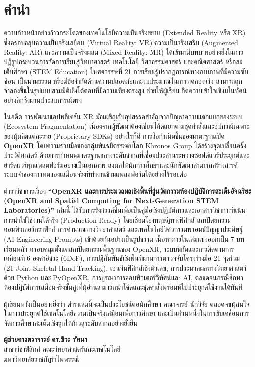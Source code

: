 \chapter*{คำนำ}

ความก้าวหน้าอย่างก้าวกระโดดของเทคโนโลยีความเป็นจริงขยาย (Extended Reality หรือ XR) ซึ่งครอบคลุมความเป็นจริงเสมือน (Virtual Reality: VR) ความเป็นจริงเสริม (Augmented Reality: AR) และความเป็นจริงผสม (Mixed Reality: MR) ได้เข้ามามีบทบาทอย่างยิ่งในการปฏิรูปกระบวนการจัดการเรียนรู้วิทยาศาสตร์ เทคโนโลยี วิศวกรรมศาสตร์ และคณิตศาสตร์ หรือสะเต็มศึกษา (STEM Education) ในศตวรรษที่ 21 การเรียนรู้ปรากฏการณ์ทางกายภาพที่มีความซับซ้อน เป็นนามธรรม หรือมีข้อจำกัดด้านความปลอดภัยและงบประมาณในการทดลองจริง สามารถถูกจำลองขึ้นในรูปแบบสามมิติเชิงโต้ตอบที่มีความเที่ยงตรงสูง ช่วยให้ผู้เรียนเกิดความเข้าใจเชิงมโนทัศน์อย่างลึกซึ้งผ่านประสบการณ์ตรง

ในอดีต การพัฒนาแอปพลิเคชัน XR มักเผชิญกับอุปสรรคสำคัญจากปัญหาความแตกแยกของระบบ (Ecosystem Fragmentation) เนื่องจากผู้พัฒนาต้องเขียนโค้ดแยกตามชุดคำสั่งและอุปกรณ์เฉพาะของผู้ผลิตแต่ละราย (Proprietary SDKs) อย่างไรก็ดี การถือกำเนิดขึ้นของมาตรฐานเปิด \textbf{OpenXR} โดยความร่วมมือของกลุ่มพันธมิตรระดับโลก Khronos Group ได้สร้างจุดเปลี่ยนครั้งประวัติศาสตร์ ด้วยการกำหนดมาตรฐานกลางระดับสากลที่เชื่อมประสานระหว่างซอฟต์แวร์ประยุกต์และฮาร์ดแวร์ทุกแพลตฟอร์มอย่างเป็นเอกภาพ ส่งผลให้นักการศึกษาและนักพัฒนาสามารถสร้างสรรค์ระบบจำลองการทดลองเสมือนจริงที่ทำงานข้ามแพลตฟอร์มได้อย่างไร้รอยต่อ

ตำราวิชาการเรื่อง \textbf{``OpenXR และการประมวลผลเชิงพื้นที่สู่นวัตกรรมห้องปฏิบัติการสะเต็มอัจฉริยะ (OpenXR and Spatial Computing for Next-Generation STEM Laboratories)''} เล่มนี้ ได้รับการรังสรรค์ขึ้นเพื่อเป็นคู่มือเชิงปฏิบัติการและเอกสารวิชาการที่เน้นการนำไปใช้งานได้จริง (Production-Ready) โดยเชื่อมโยงทฤษฎีทางฟิสิกส์ สถาปัตยกรรมคอมพิวเตอร์กราฟิกส์ การคำนวณทางวิทยาศาสตร์ และเทคโนโลยีวิศวกรรมพรอมพ์ปัญญาประดิษฐ์ (AI Engineering Prompts) เข้าด้วยกันอย่างเป็นรูปธรรม เนื้อหาภายในเล่มแบ่งออกเป็น 7 บทเรียนหลัก ครอบคลุมตั้งแต่สถาปัตยกรรมพื้นฐานของ OpenXR, ระบบพิกัดและการติดตามการเคลื่อนที่ 6 องศาอิสระ (6DoF), การปฏิสัมพันธ์เชิงพื้นที่ผ่านการตรวจจับโครงร่างมือ 21 จุดร่วม (21-Joint Skeletal Hand Tracking), เอนจินฟิสิกส์เชิงตัวเลข, การประมวลผลทางวิทยาศาสตร์ด้วย Python และ PyOpenXR, การบูรณาการคอมพิวเตอร์วิทัศน์และ AI, ตลอดจนกรณีศึกษาห้องปฏิบัติการเสมือนจริงขั้นสูงที่ผู้อ่านสามารถนำโค้ดและชุดคำสั่งพรอมพ์ไปประยุกต์ใช้งานได้ทันที


ผู้เขียนหวังเป็นอย่างยิ่งว่า ตำราเล่มนี้จะเป็นประโยชน์ต่อนักศึกษา คณาจารย์ นักวิจัย ตลอดจนผู้สนใจในการประยุกต์ใช้เทคโนโลยีความเป็นจริงเสมือนเพื่อการศึกษา และเป็นส่วนหนึ่งในการขับเคลื่อนการจัดการศึกษาสะเต็มเชิงรุกให้ก้าวสู่ระดับสากลอย่างยั่งยืน

\vspace{1.5cm}
\begin{flushright}
    \textbf{ผู้ช่วยศาสตราจารย์ ดร.ชีวะ ทัศนา}\\[4pt]
    สาขาวิชาฟิสิกส์ คณะวิทยาศาสตร์และเทคโนโลยี\\[2pt]
    มหาวิทยาลัยราชภัฏรำไพพรรณี
\end{flushright}
\clearpage
